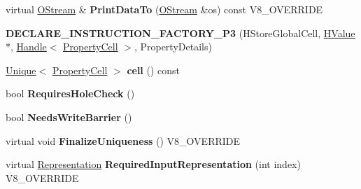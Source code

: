 \begin{DoxyCompactItemize}
\item 
\hypertarget{classv8_1_1internal_1_1_v8___f_i_n_a_l_ac450dad970b14246be761ccf5004924b}{}virtual \hyperlink{classv8_1_1internal_1_1_o_stream}{O\+Stream} \& {\bfseries Print\+Data\+To} (\hyperlink{classv8_1_1internal_1_1_o_stream}{O\+Stream} \&os) const V8\+\_\+\+O\+V\+E\+R\+R\+I\+D\+E\label{classv8_1_1internal_1_1_v8___f_i_n_a_l_ac450dad970b14246be761ccf5004924b}

\item 
\hypertarget{classv8_1_1internal_1_1_v8___f_i_n_a_l_a091f8932460f8c20ef4ce59253d8c876}{}{\bfseries D\+E\+C\+L\+A\+R\+E\+\_\+\+I\+N\+S\+T\+R\+U\+C\+T\+I\+O\+N\+\_\+\+F\+A\+C\+T\+O\+R\+Y\+\_\+\+P3} (H\+Store\+Global\+Cell, \hyperlink{classv8_1_1internal_1_1_h_value}{H\+Value} $\ast$, \hyperlink{classv8_1_1internal_1_1_handle}{Handle}$<$ \hyperlink{classv8_1_1internal_1_1_property_cell}{Property\+Cell} $>$, Property\+Details)\label{classv8_1_1internal_1_1_v8___f_i_n_a_l_a091f8932460f8c20ef4ce59253d8c876}

\item 
\hypertarget{classv8_1_1internal_1_1_v8___f_i_n_a_l_a8cf30b279bd428e72b3f96f5139b41af}{}\hyperlink{classv8_1_1internal_1_1_unique}{Unique}$<$ \hyperlink{classv8_1_1internal_1_1_property_cell}{Property\+Cell} $>$ {\bfseries cell} () const \label{classv8_1_1internal_1_1_v8___f_i_n_a_l_a8cf30b279bd428e72b3f96f5139b41af}

\item 
\hypertarget{classv8_1_1internal_1_1_v8___f_i_n_a_l_ad8cc70ff598270c0fed15cee38ba508a}{}bool {\bfseries Requires\+Hole\+Check} ()\label{classv8_1_1internal_1_1_v8___f_i_n_a_l_ad8cc70ff598270c0fed15cee38ba508a}

\item 
\hypertarget{classv8_1_1internal_1_1_v8___f_i_n_a_l_a385305b19f0305f3135782f27e02646a}{}bool {\bfseries Needs\+Write\+Barrier} ()\label{classv8_1_1internal_1_1_v8___f_i_n_a_l_a385305b19f0305f3135782f27e02646a}

\item 
\hypertarget{classv8_1_1internal_1_1_v8___f_i_n_a_l_a935c3ddc60915dd102968e2b529aa1fc}{}virtual void {\bfseries Finalize\+Uniqueness} () V8\+\_\+\+O\+V\+E\+R\+R\+I\+D\+E\label{classv8_1_1internal_1_1_v8___f_i_n_a_l_a935c3ddc60915dd102968e2b529aa1fc}

\item 
\hypertarget{classv8_1_1internal_1_1_v8___f_i_n_a_l_a6c6d1f37f40b113d8f4062f1ffff7215}{}virtual \hyperlink{classv8_1_1internal_1_1_representation}{Representation} {\bfseries Required\+Input\+Representation} (int index) V8\+\_\+\+O\+V\+E\+R\+R\+I\+D\+E\label{classv8_1_1internal_1_1_v8___f_i_n_a_l_a6c6d1f37f40b113d8f4062f1ffff7215}


\end{DoxyCompactItemize}
